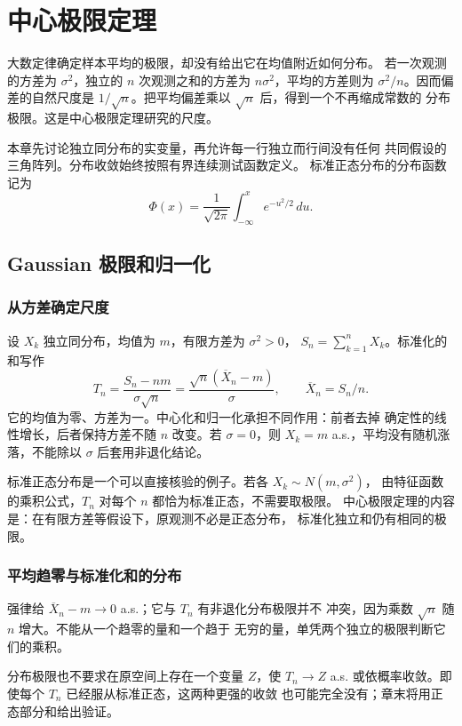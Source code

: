 \chapter{中心极限定理}
\label{chap:central-limit-theorem}

大数定律确定样本平均的极限，却没有给出它在均值附近如何分布。
若一次观测的方差为 $\sigma^2$，独立的 $n$ 次观测之和的方差为
$n\sigma^2$，平均的方差则为 $\sigma^2/n$。因而偏差的自然尺度是
$1/\sqrt n$。把平均偏差乘以 $\sqrt n$ 后，得到一个不再缩成常数的
分布极限。这是中心极限定理研究的尺度。

本章先讨论独立同分布的实变量，再允许每一行独立而行间没有任何
共同假设的三角阵列。分布收敛始终按照有界连续测试函数定义。
标准正态分布的分布函数记为
\[
 \Phi(x)=\frac1{\sqrt{2\pi}}\int_{-\infty}^x e^{-u^2/2}\,du.
\]

\section{Gaussian 极限和归一化}
\label{sec:gaussian-normalization}

\subsection{从方差确定尺度}

设 $X_k$ 独立同分布，均值为 $m$，有限方差为 $\sigma^2>0$，
$S_n=\sum_{k=1}^nX_k$。标准化的和写作
\[
 T_n=\frac{S_n-nm}{\sigma\sqrt n}
     =\frac{\sqrt n(\overline X_n-m)}\sigma,
 \qquad \overline X_n=S_n/n.
\]
它的均值为零、方差为一。中心化和归一化承担不同作用：前者去掉
确定性的线性增长，后者保持方差不随 $n$ 改变。若 $\sigma=0$，则
$X_k=m$ a.s.，平均没有随机涨落，不能除以 $\sigma$ 后套用非退化结论。

标准正态分布是一个可以直接核验的例子。若各 $X_k\sim N(m,\sigma^2)$，
由特征函数的乘积公式，$T_n$ 对每个 $n$ 都恰为标准正态，不需要取极限。
中心极限定理的内容是：在有限方差等假设下，原观测不必是正态分布，
标准化独立和仍有相同的极限。

\subsection{平均趋零与标准化和的分布}

强律给 $\overline X_n-m\to0$ a.s.；它与 $T_n$ 有非退化分布极限并不
冲突，因为乘数 $\sqrt n$ 随 $n$ 增大。不能从一个趋零的量和一个趋于
无穷的量，单凭两个独立的极限判断它们的乘积。

分布极限也不要求在原空间上存在一个变量 $Z$，使 $T_n\to Z$ a.s.
或依概率收敛。即使每个 $T_n$ 已经服从标准正态，这两种更强的收敛
也可能完全没有；章末将用正态部分和给出验证。

